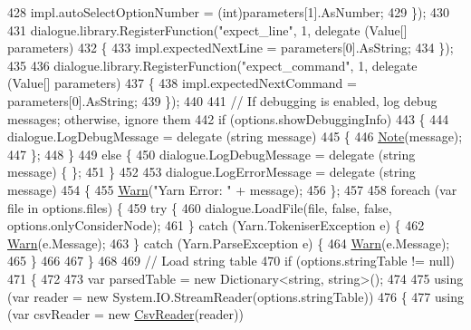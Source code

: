 \begin{DoxyCode}
428                 impl.autoSelectOptionNumber = (int)parameters[1].AsNumber;
429             \});
430 
431             dialogue.library.RegisterFunction(\textcolor{stringliteral}{"expect\_line"}, 1, delegate (Value[] parameters)
432             \{
433                 impl.expectedNextLine = parameters[0].AsString;
434             \});
435 
436             dialogue.library.RegisterFunction(\textcolor{stringliteral}{"expect\_command"}, 1, delegate (Value[] parameters)
437             \{
438                 impl.expectedNextCommand = parameters[0].AsString;
439             \});
440 
441             \textcolor{comment}{// If debugging is enabled, log debug messages; otherwise, ignore them}
442             \textcolor{keywordflow}{if} (options.showDebuggingInfo)
443             \{
444                 dialogue.LogDebugMessage = delegate (\textcolor{keywordtype}{string} message)
445                 \{
446                     \hyperlink{a00169_a939cc9e943c574b36c6af93e9c772702}{Note}(message);
447                 \};
448             \}
449             \textcolor{keywordflow}{else} \{
450                 dialogue.LogDebugMessage = delegate (\textcolor{keywordtype}{string} message) \{ \};
451             \}
452 
453             dialogue.LogErrorMessage = delegate (\textcolor{keywordtype}{string} message)
454             \{
455                 \hyperlink{a00169_a979bb6f049b6c5294f745a19e24ddd9d}{Warn}(\textcolor{stringliteral}{"Yarn Error: "} + message);
456             \};
457 
458             \textcolor{keywordflow}{foreach} (var file \textcolor{keywordflow}{in} options.files) \{
459                 \textcolor{keywordflow}{try} \{
460                     dialogue.LoadFile(file, \textcolor{keyword}{false}, \textcolor{keyword}{false}, options.onlyConsiderNode);
461                 \} \textcolor{keywordflow}{catch} (Yarn.TokeniserException e) \{
462                     \hyperlink{a00169_a979bb6f049b6c5294f745a19e24ddd9d}{Warn}(e.Message);
463                 \} \textcolor{keywordflow}{catch} (Yarn.ParseException e) \{
464                     \hyperlink{a00169_a979bb6f049b6c5294f745a19e24ddd9d}{Warn}(e.Message);
465                 \}
466 
467             \}
468 
469             \textcolor{comment}{// Load string table}
470             \textcolor{keywordflow}{if} (options.stringTable != null)
471             \{
472 
473                 var parsedTable = \textcolor{keyword}{new} Dictionary<string, string>();
474 
475                 \textcolor{keyword}{using} (var reader = \textcolor{keyword}{new} System.IO.StreamReader(options.stringTable))
476                 \{
477                     \textcolor{keyword}{using} (var csvReader = \textcolor{keyword}{new} \hyperlink{a00055}{CsvReader}(reader))

\end{DoxyCode}
